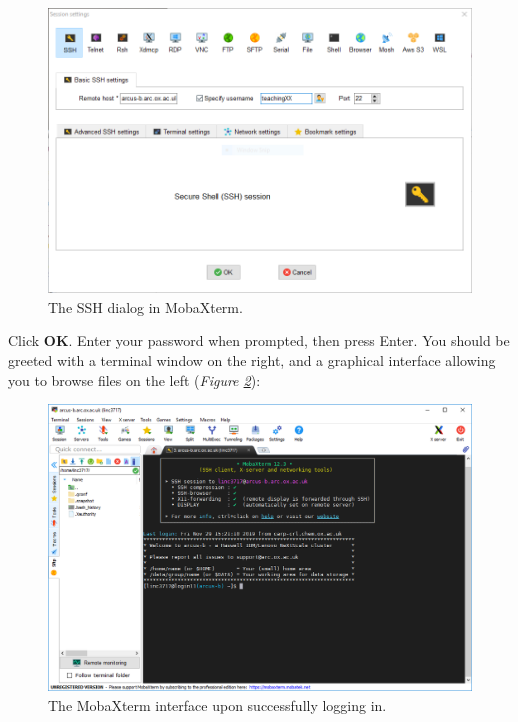 \documentclass[10pt]{article}
\newcommand{\figref}[1]{\textit{Figure \ref{fig:#1}}}
\begin{document}
\begin{figure}[H]
    \centering
    \includegraphics[scale=0.5]{./img/ssh}
    \caption{The SSH dialog in MobaXterm.}
    \label{fig:ssh}
\end{figure}

Click \textbf{OK}. Enter your password when prompted, then press Enter. You should be greeted with a terminal window on the right, and a graphical interface allowing you to browse files on the left (\figref{loggedin}):

\begin{figure}[H]
    \centering
    \includegraphics[scale=0.38]{./img/loggedin}
    \caption{The MobaXterm interface upon successfully logging in.}
    \label{fig:loggedin}
\end{figure}
\end{document}
